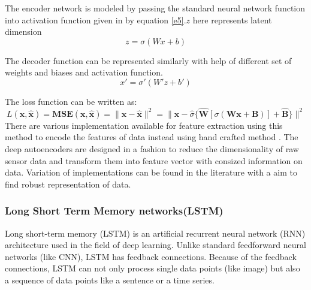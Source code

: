 The encoder network is modeled by passing the standard neural network function into activation function given in by equation \ref{e5}.$z$ here represents latent dimension
\begin{equation}
z=\sigma (Wx+b)
\label{e5}
\end{equation}

The decoder function can be represented similarly with help of different set of weights and biases and activation function.
\begin{equation}
x'= \sigma'(W'z+b')
\label{e6}
\end{equation}

The loss function can be written as:
\begin{equation} 
L(\mathbf{x}, \hat{\mathbf{x}}) = \mathbf{MSE}(\mathbf{x}, \hat{\mathbf{x}}) = \|  \mathbf{x} - \hat{\mathbf{x}} \| ^2 =  \| \mathbf{x} - \hat{\sigma} \{ \hat{\mathbf{W}} \left[\sigma ( \mathbf{W}\mathbf{x} + \mathbf{B} )\right]  + \hat{\mathbf{B}} \} \| ^2 \end{equation}
There are various implementation available for feature extraction using this method to encode the features of data instead using hand crafted method \cite{gerazov2018variational}. The deep autoencoders are designed in a fashion to reduce the dimensionality of raw sensor data \cite{ravi2019current} and transform them into feature vector with consized information on data. Variation of implementations can be found in the literature with a aim to find robust representation of data.
    \subsubsection{Long Short Term Memory networks(LSTM)}
    Long short-term memory (LSTM) is an artificial recurrent neural network (RNN) architecture used in the field of deep learning. Unlike standard feedforward neural networks (like CNN), LSTM has feedback connections. Because of the feedback connections, LSTM can not only process single data points (like image) but also a sequence of data points like a sentence or a time series. 
    
